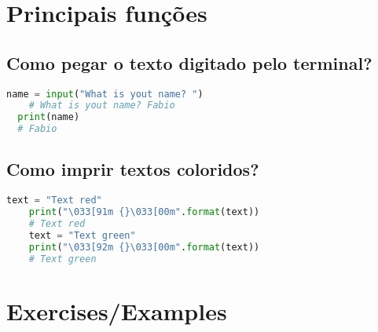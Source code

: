 \chapter{Principais funções}
\section{Como pegar o texto digitado pelo terminal?}
\begin{lstlisting}[language=python]
	name = input("What is yout name? ")
	# What is yout name? Fabio
  print(name)
  # Fabio
  \end{lstlisting}
  \section{Como imprir textos coloridos?}
\begin{lstlisting}[language=python]
	text = "Text red"
	print("\033[91m {}\033[00m".format(text))
	# Text red
	text = "Text green"
	print("\033[92m {}\033[00m".format(text))
	# Text green
  \end{lstlisting}
\chapter{Exercises/Examples}
